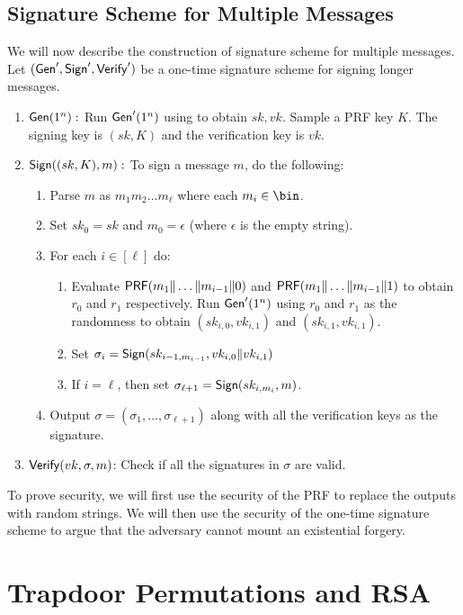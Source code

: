 \subsection{Signature Scheme for Multiple Messages}
We will now describe the construction of signature scheme for multiple messages. Let $(\mathsf{Gen}',\mathsf{Sign}',\mathsf{Verify}')$ be a one-time signature scheme for signing longer messages. 
\begin{enumerate}
    \item $\mathsf{Gen}(1^n):$ Run $\mathsf{Gen}'(1^n)$ using to obtain $sk,vk$. Sample a PRF key $K$. The signing key is $(sk,K)$ and the verification key is $vk$.
    \item $\mathsf{Sign}((sk,K),m):$ To sign a message $m$, do the following:
    \begin{enumerate}
        \item Parse $m$ as $m_1m_2\ldots m_{\ell}$ where each $m_i \in \bin$.
        \item Set $sk_0 = sk$ and $m_0 = \epsilon$ (where $\epsilon$ is the empty string).
        \item For each $i \in [\ell]$ do:
        \begin{enumerate}
            \item Evaluate $\mathsf{PRF}(m_1\|\ldots\|m_{i-1}\|0)$ and $\mathsf{PRF}(m_1\|\ldots\|m_{i-1}\|1)$ to obtain $r_0$ and $r_1$ respectively. Run $\mathsf{Gen}'(1^n)$ using $r_0$ and $r_1$ as the randomness to obtain $(sk_{i,0},vk_{i,1})$ and $(sk_{i,1},vk_{i,1})$.
            \item Set $\sigma_i = \mathsf{Sign}(sk_{i-1,m_{i-1}},vk_{i,0}\|vk_{i,1})$
            \item If $i = \ell$, then set $\sigma_{\ell+1} = \mathsf{Sign}(sk_{i,m_i},m)$.
            
        \end{enumerate}
        \item Output $\sigma = (\sigma_1,\ldots,\sigma_{\ell+1})$ along with all the verification keys as the signature.
    \end{enumerate}
    \item $\mathsf{Verify}(vk,\sigma,m)$: Check if all the signatures in $\sigma$ are valid.
\end{enumerate}

To prove security, we will first use the security of the PRF to replace the outputs with random strings. We will then use the security of the one-time signature scheme to argue that the adversary cannot mount an existential forgery.

\section{Trapdoor Permutations and RSA} 

